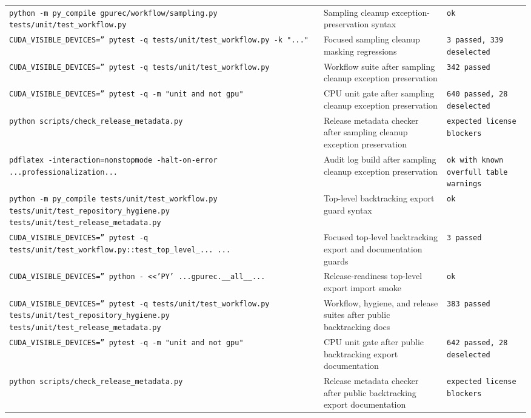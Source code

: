 \documentclass[11pt]{article}
\begin{document}
\begin{center}
\begin{tabular}{lll}
\texttt{python -m py\_compile gpurec/workflow/sampling.py tests/unit/test\_workflow.py} &
Sampling cleanup exception-preservation syntax &
\texttt{ok} \\
\texttt{CUDA\_VISIBLE\_DEVICES='' pytest -q tests/unit/test\_workflow.py -k "..."} &
Focused sampling cleanup masking regressions &
\texttt{3 passed, 339 deselected} \\
\texttt{CUDA\_VISIBLE\_DEVICES='' pytest -q tests/unit/test\_workflow.py} &
Workflow suite after sampling cleanup exception preservation &
\texttt{342 passed} \\
\texttt{CUDA\_VISIBLE\_DEVICES='' pytest -q -m "unit and not gpu"} &
CPU unit gate after sampling cleanup exception preservation &
\texttt{640 passed, 28 deselected} \\
\texttt{python scripts/check\_release\_metadata.py} &
Release metadata checker after sampling cleanup exception preservation &
\texttt{expected license blockers} \\
\texttt{pdflatex -interaction=nonstopmode -halt-on-error ...professionalization...} &
Audit log build after sampling cleanup exception preservation &
\texttt{ok with known overfull table warnings} \\
\texttt{python -m py\_compile tests/unit/test\_workflow.py tests/unit/test\_repository\_hygiene.py tests/unit/test\_release\_metadata.py} &
Top-level backtracking export guard syntax &
\texttt{ok} \\
\texttt{CUDA\_VISIBLE\_DEVICES='' pytest -q tests/unit/test\_workflow.py::test\_top\_level\_... ...} &
Focused top-level backtracking export and documentation guards &
\texttt{3 passed} \\
\texttt{CUDA\_VISIBLE\_DEVICES='' python - <<'PY' ...gpurec.\_\_all\_\_...} &
Release-readiness top-level export import smoke &
\texttt{ok} \\
\texttt{CUDA\_VISIBLE\_DEVICES='' pytest -q tests/unit/test\_workflow.py tests/unit/test\_repository\_hygiene.py tests/unit/test\_release\_metadata.py} &
Workflow, hygiene, and release suites after public backtracking docs &
\texttt{383 passed} \\
\texttt{CUDA\_VISIBLE\_DEVICES='' pytest -q -m "unit and not gpu"} &
CPU unit gate after public backtracking export documentation &
\texttt{642 passed, 28 deselected} \\
\texttt{python scripts/check\_release\_metadata.py} &
Release metadata checker after public backtracking export documentation &
\texttt{expected license blockers} \\

\end{tabular}
\end{center}
\end{document}
